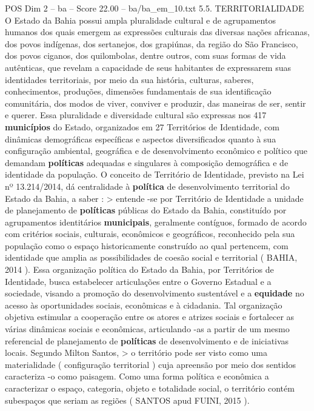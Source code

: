 \begin{textsample}{POS Dim 2 – ba – Score 22.00 – ba/ba\_em\_10.txt}  \label{ex:f2_pos_040}
5.5.
TERRITORIALIDADE O Estado da Bahia possui ampla pluralidade cultural e de agrupamentos humanos dos quais emergem as expressões culturais das diversas nações africanas, dos povos indígenas, dos sertanejos, dos grapiúnas, da região do São Francisco, dos povos ciganos, dos quilombolas, dentre outros, com suas formas de vida autênticas, que revelam a capacidade de seus habitantes de expressarem suas identidades territoriais, por meio da sua história, culturas, saberes, conhecimentos, produções, dimensões fundamentais de sua identificação comunitária, dos modos de viver, conviver e produzir, das maneiras de ser, sentir e querer.
Essa pluralidade e diversidade cultural são expressas nos 417 \textbf{municípios} do Estado, organizados em 27 Territórios de Identidade, com dinâmicas demográficas específicas e aspectos diversificados quanto à sua configuração ambiental, geográfica e de desenvolvimento econômico e político que demandam \textbf{políticas} adequadas e singulares à composição demográfica e de identidade da população.
O conceito de Território de Identidade, previsto na Lei nº 13.214/2014, dá centralidade à \textbf{política} de desenvolvimento territorial do Estado da Bahia, a saber : > entende -se por Território de Identidade a unidade de planejamento de \textbf{políticas} públicas do Estado da Bahia, constituído por agrupamentos identitários \textbf{municipais}, geralmente contíguos, formado de acordo com critérios sociais, culturais, econômicos e geográficos, reconhecido pela sua população como o espaço historicamente construído ao qual pertencem, com identidade que amplia as possibilidades de coesão social e territorial ( BAHIA, 2014 ).
Essa organização política do Estado da Bahia, por Territórios de Identidade, busca estabelecer articulações entre o Governo Estadual e a sociedade, visando a promoção do desenvolvimento sustentável e a \textbf{equidade} no acesso às oportunidades sociais, econômicas e à cidadania.
Tal organização objetiva estimular a cooperação entre os atores e atrizes sociais e fortalecer as várias dinâmicas sociais e econômicas, articulando -as a partir de um mesmo referencial de planejamento de \textbf{políticas} de desenvolvimento e de iniciativas locais.
Segundo Milton Santos, > o território pode ser visto como uma materialidade ( configuração territorial ) cuja apreensão por meio dos sentidos caracteriza -o como paisagem.
Como uma forma política e econômica a caracterizar o espaço, categoria, objeto e totalidade social, o território contém subespaços que seriam as regiões ( SANTOS apud FUINI, 2015 ).

\end{textsample}
